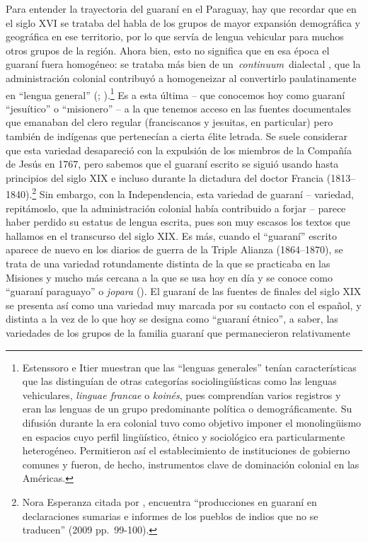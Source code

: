 \documentclass[output=paper]{langscibook}
\begin{document}
Para entender la trayectoria del guaraní en el Paraguay, hay que recordar que en el siglo XVI se trataba del habla de los grupos de mayor expansión demográfica y geográfica en ese territorio, por lo que servía de lengua vehicular para muchos otros grupos de la región. Ahora bien, esto no significa que en esa época el guaraní fuera homogéneo: se trataba más bien de un~\textit{continuum}~dialectal \citep{CandelaMelià2015}, que la administración colonial contribuyó a homogeneizar al convertirlo paulatinamente en “lengua general” (\citealt{Estenssoro2015};    \citealt{EstenssoroItier2015}).\footnote{Estenssoro e Itier muestran que las “lenguas generales” tenían características que las distinguían de otras categorías sociolingüísticas como las lenguas vehiculares, \textit{linguae francae} o \textit{koinés}, pues comprendían varios registros y eran las lenguas de un grupo predominante política o demográficamente. Su difusión durante la era colonial tuvo como objetivo imponer el monolingüismo en espacios cuyo perfil lingüístico, étnico y sociológico era particularmente heterogéneo. Permitieron así el establecimiento de instituciones de gobierno comunes y fueron, de hecho, instrumentos clave de dominación colonial en las Américas.} Es a esta última -- que conocemos hoy como guaraní “jesuítico” o “misionero” -- a la que tenemos acceso en las fuentes documentales que emanaban del clero regular (franciscanos y jesuitas, en particular) pero también de indígenas que pertenecían a cierta élite letrada. Se suele considerar que esta variedad desapareció con la expulsión de los miembros de la Compañía de Jesús en 1767, pero sabemos que el guaraní escrito se siguió usando hasta principios del siglo XIX e incluso durante la dictadura del doctor Francia (1813--1840).\footnote{Nora  Esperanza \citet{Bouvet2009} citada por \citet{Boidin2014b}, encuentra “producciones en guaraní en declaraciones sumarias e informes de los pueblos de indios que no se traducen”  (2009 pp.~99-100).}  Sin embargo, con la Independencia, esta variedad de guaraní -- variedad, repitámoslo, que la administración colonial había contribuido a forjar -- parece haber perdido su estatus de lengua escrita, pues son muy escasos los textos que hallamos en el transcurso del siglo XIX. Es más, cuando el “guaraní” escrito aparece de nuevo en los diarios de guerra de la Triple Alianza (1864--1870), se trata de una variedad rotundamente distinta de la que se practicaba en las Misiones y mucho más cercana a la que se usa hoy en día y se conoce como “guaraní paraguayo” o \textit{jopara} (\citealt{CaballeroCamposFerreiraSegovia2006}). El guaraní de las fuentes de finales del siglo XIX se presenta así como una variedad muy marcada por su contacto con el español, y distinta a la vez de lo que hoy se designa como “guaraní étnico”, a saber, las variedades de los grupos de la familia guaraní que permanecieron relativamente
\end{document}
